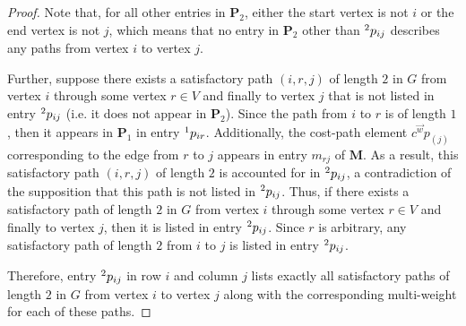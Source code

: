 \documentclass[12pt]{amsart}
\theoremstyle{definition}
\theoremstyle{remark}
\numberwithin{equation}{section}
\begin{document}
\begin{proof}
Note that, for all other entries in $\mathbf{P}_2$, either the start vertex is not $i$ or the end vertex is not $j$, which means that no entry in $\mathbf{P}_2$ other than $\prescript{2}{}{p_{ij}}$ describes any paths from vertex $i$ to vertex $j$.

Further, suppose there exists a satisfactory path $(i,r,j)$ of length $2$ in $G$ from vertex $i$ through some vertex $r \in V$ and finally to vertex $j$ that is not listed in entry $\prescript{2}{}{p_{ij}}$ (i.e. it does not appear in $\mathbf{P}_2$). Since the path from $i$ to $r$ is of length $1$, then it appears in $\mathbf{P}_1$ in entry $\prescript{1}{}{p_{ir}}$. Additionally, the cost-path element $c^{\vec{w}} p_{(j)}$ corresponding to the edge from $r$ to $j$ appears in entry $m_{rj}$ of $\mathbf{M}$. As a result, this satisfactory path $(i,r,j)$ of length $2$ is accounted for in $\prescript{2}{}{p_{ij}}$, a contradiction of the supposition that this path is not listed in $\prescript{2}{}{p_{ij}}$. Thus, if there exists a satisfactory path of length $2$ in $G$ from vertex $i$ through some vertex $r \in V$ and finally to vertex $j$, then it is listed in entry $\prescript{2}{}{p_{ij}}$. Since $r$ is arbitrary, any satisfactory path of length $2$ from $i$ to $j$ is listed in entry $\prescript{2}{}{p_{ij}}$.

Therefore, entry $\prescript{2}{}{p_{ij}}$ in row $i$ and column $j$ lists exactly all satisfactory paths of length $2$ in $G$ from vertex $i$ to vertex $j$ along with the corresponding multi-weight for each of these paths.
\end{proof}
\end{document}
